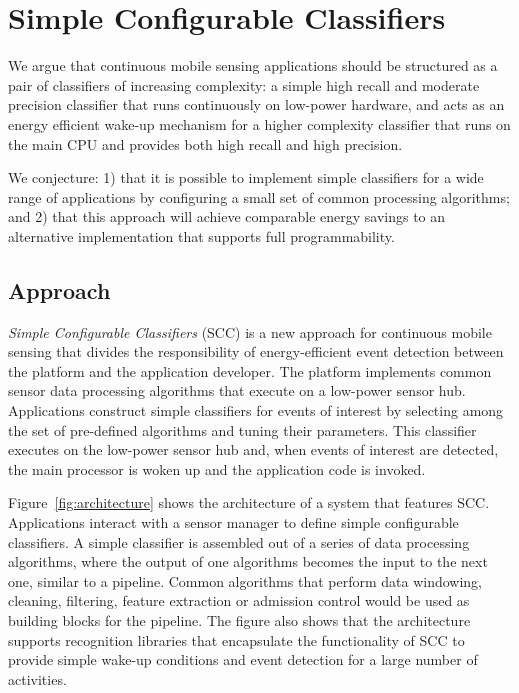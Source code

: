 \section{Simple Configurable Classifiers}
\label{sec:conjecture}

We argue that continuous mobile sensing applications should be
structured as a pair of classifiers of increasing complexity: a simple
high recall and moderate precision classifier that runs continuously
on low-power hardware, and acts as an energy efficient wake-up
mechanism for a higher complexity classifier that runs on the main CPU
and provides both high recall and high precision.

We conjecture: 1) that it is possible to implement simple classifiers for a 
wide range of applications by configuring a small set of common processing 
algorithms; and  2) that this approach will achieve comparable energy 
savings to an alternative implementation that supports full programmability.

\subsection {Approach}

{\em Simple Configurable Classifiers} (SCC) is a new approach for
continuous mobile sensing that divides the responsibility of
energy-efficient event detection between the platform and
the application developer.  The platform implements common sensor data
processing algorithms that execute on a low-power sensor hub.
Applications construct simple classifiers for events of interest by
selecting among the set of pre-defined 
algorithms and tuning their parameters.  This classifier executes on
the low-power sensor hub and, when events of interest are detected,
the main processor is woken up and the application code is invoked.
  
Figure~\ref{fig:architecture} shows the architecture of a
system that features SCC. Applications interact with a sensor 
manager to define simple configurable classifiers.  A simple 
classifier is assembled out of a series of data processing
algorithms, where the output of one algorithms becomes the input to
the next one, similar to a pipeline.  Common algorithms
that perform data windowing, cleaning, filtering, feature extraction 
or admission control would be used as building blocks for the 
pipeline.  The figure also
shows that the architecture supports recognition libraries that
encapsulate the functionality of SCC to provide simple
wake-up conditions and event detection for a large number of activities. 


